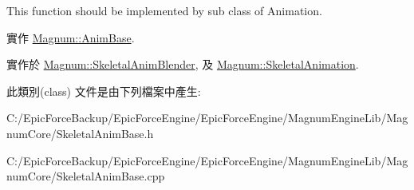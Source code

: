 This function should be implemented by sub class of Animation. 

實作 \hyperlink{class_magnum_1_1_anim_base_aa4aff002b23918cb98640966689c7aa6}{Magnum\+::\+Anim\+Base}.



實作於 \hyperlink{class_magnum_1_1_skeletal_anim_blender_ad648bb5f97296b7e5ac203967c32a66b}{Magnum\+::\+Skeletal\+Anim\+Blender}, 及 \hyperlink{class_magnum_1_1_skeletal_animation_a2770fe6c5215d7ba5a28df07ac926ae5}{Magnum\+::\+Skeletal\+Animation}.



此類別(class) 文件是由下列檔案中產生\+:\begin{DoxyCompactItemize}
\item 
C\+:/\+Epic\+Force\+Backup/\+Epic\+Force\+Engine/\+Epic\+Force\+Engine/\+Magnum\+Engine\+Lib/\+Magnum\+Core/Skeletal\+Anim\+Base.\+h\item 
C\+:/\+Epic\+Force\+Backup/\+Epic\+Force\+Engine/\+Epic\+Force\+Engine/\+Magnum\+Engine\+Lib/\+Magnum\+Core/Skeletal\+Anim\+Base.\+cpp\end{DoxyCompactItemize}
